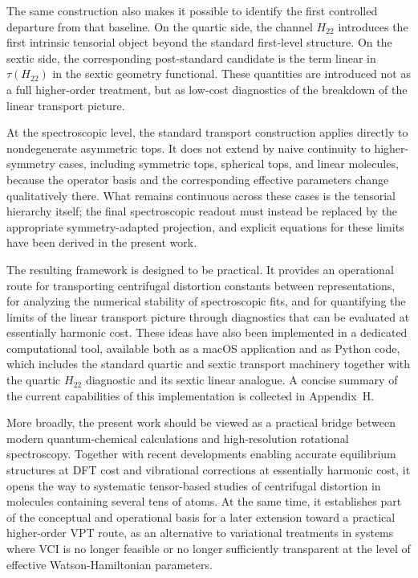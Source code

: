 \documentclass[aip,jcp,reprint,floatfix]{revtex4-2}
\begin{document}
The same construction also makes it possible to identify the first
controlled departure from that baseline. On the quartic side, the
channel $H_{22}$ introduces the first intrinsic tensorial object beyond
the standard first-level structure. On the sextic side, the
corresponding post-standard candidate is the term linear in
$\tau(H_{22})$ in the sextic geometry functional. These quantities are
introduced not as a full higher-order treatment, but as low-cost
diagnostics of the breakdown of the linear transport picture.

At the spectroscopic level, the standard transport construction applies
directly to nondegenerate asymmetric tops. It does not extend by naive
continuity to higher-symmetry cases, including symmetric tops,
spherical tops, and linear molecules, because the operator basis and the
corresponding effective parameters change qualitatively there. What
remains continuous across these cases is the tensorial hierarchy itself;
the final spectroscopic readout must instead be replaced by the
appropriate symmetry-adapted projection, and explicit equations for
these limits have been derived in the present work.

The resulting framework is designed to be practical. It provides an
operational route for transporting centrifugal distortion constants
between representations, for analyzing the numerical stability of
spectroscopic fits, and for quantifying the limits of the linear
transport picture through diagnostics that can be evaluated at
essentially harmonic cost. These ideas have also been implemented in a
dedicated computational tool, available both as a macOS application and
as Python code, which includes the standard quartic and sextic
transport machinery together with the quartic $H_{22}$ diagnostic and
its sextic linear analogue. A concise summary of the current
capabilities of this implementation is collected in Appendix~H.

More broadly, the present work should be viewed as a practical bridge
between modern quantum-chemical calculations and high-resolution
rotational spectroscopy. Together with recent developments enabling
accurate equilibrium structures at DFT cost and vibrational corrections
at essentially harmonic cost, it opens the way to systematic tensor-based
studies of centrifugal distortion in molecules containing several tens
of atoms. At the same time, it establishes part of the conceptual and
operational basis for a later extension toward a practical higher-order VPT
route, as an alternative to variational treatments in systems where VCI
is no longer feasible or no longer sufficiently transparent at the level
of effective Watson-Hamiltonian parameters.
\end{document}
